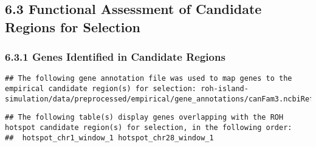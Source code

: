 \documentclass[
]{article}
\begin{document}
\subsection{6.3 Functional Assessment of Candidate Regions for
Selection}\label{functional-assessment-of-candidate-regions-for-selection}

\subsubsection{6.3.1 Genes Identified in Candidate
Regions}\label{genes-identified-in-candidate-regions}

\begin{verbatim}
## The following gene annotation file was used to map genes to the empirical candidate region(s) for selection: roh-island-simulation/data/preprocessed/empirical/gene_annotations/canFam3.ncbiRefSeq.gtf.gz
\end{verbatim}

\begin{verbatim}
## The following table(s) display genes overlapping with the ROH hotspot candidate region(s) for selection, in the following order:
##  hotspot_chr1_window_1 hotspot_chr28_window_1
\end{verbatim}
\end{document}

